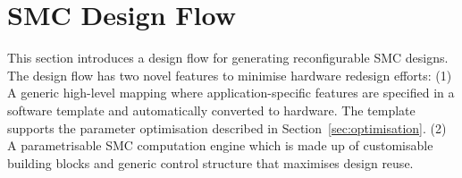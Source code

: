 



\section{SMC Design Flow}
\label{sec:design}

This section introduces a design flow for generating reconfigurable SMC 
designs. The design flow has two novel features to minimise hardware redesign efforts:
(1) A generic high-level mapping where application-specific features are specified in a software template and automatically converted to hardware.
The template supports the parameter optimisation described in Section~\ref{sec:optimisation}.
(2) A parametrisable SMC computation engine which is made up of customisable building blocks and generic control structure that maximises design reuse.

